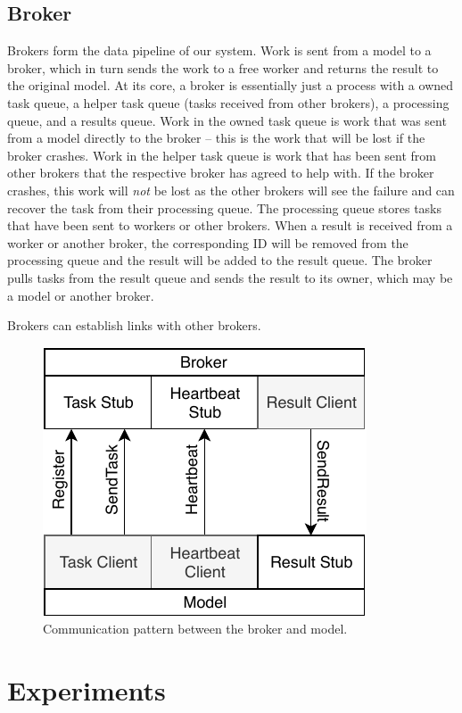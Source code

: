 \documentclass[conference]{IEEEtran}
\begin{document}
\subsection{Broker}
Brokers form the data pipeline of our system. Work is sent from a model to a broker,
which in turn sends the work to a free worker and returns the result to the original
model. At its core, a broker is essentially just a process with a owned task queue,
a helper task queue (tasks received from other brokers), a processing queue, and
a results queue. Work in the owned task queue is work that was sent from a model directly
to the broker -- this is the work that will be lost if the broker crashes. Work in
the helper task queue is work that has been sent from other brokers that the respective
broker has agreed to help with. If the broker crashes, this work will \emph{not} be
lost as the other brokers will see the failure and can recover the task from their
processing queue. The processing queue stores tasks that have been sent to
workers or other brokers. When a result is received from a worker or another broker,
the corresponding ID will be removed from the processing queue and the result will
be added to the result queue. The broker pulls tasks from the result queue and sends
the result to its owner, which may be a model or another broker.

Brokers can establish links with other brokers.

\begin{figure}
  \centering
  \includegraphics{img/model_broker}
  \caption{Communication pattern between the broker and
    model.}\label{fig:broker-model}
\end{figure}

\section{Experiments}
\end{document}
